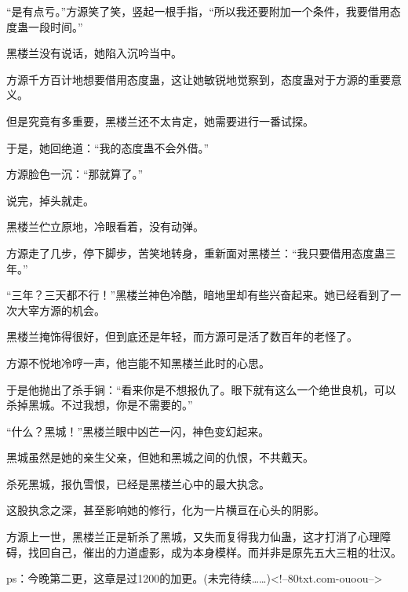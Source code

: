 \begin{this_body}
“是有点亏。”方源笑了笑，竖起一根手指，“所以我还要附加一个条件，我要借用态度蛊一段时间。”

黑楼兰没有说话，她陷入沉吟当中。

方源千方百计地想要借用态度蛊，这让她敏锐地觉察到，态度蛊对于方源的重要意义。

但是究竟有多重要，黑楼兰还不太肯定，她需要进行一番试探。

于是，她回绝道：“我的态度蛊不会外借。”

方源脸色一沉：“那就算了。”

说完，掉头就走。

黑楼兰伫立原地，冷眼看着，没有动弹。

方源走了几步，停下脚步，苦笑地转身，重新面对黑楼兰：“我只要借用态度蛊三年。”

“三年？三天都不行！”黑楼兰神色冷酷，暗地里却有些兴奋起来。她已经看到了一次大宰方源的机会。

黑楼兰掩饰得很好，但到底还是年轻，而方源可是活了数百年的老怪了。

方源不悦地冷哼一声，他岂能不知黑楼兰此时的心思。

于是他抛出了杀手锏：“看来你是不想报仇了。眼下就有这么一个绝世良机，可以杀掉黑城。不过我想，你是不需要的。”

“什么？黑城！”黑楼兰眼中凶芒一闪，神色变幻起来。

黑城虽然是她的亲生父亲，但她和黑城之间的仇恨，不共戴天。

杀死黑城，报仇雪恨，已经是黑楼兰心中的最大执念。

这股执念之深，甚至影响她的修行，化为一片横亘在心头的阴影。

方源上一世，黑楼兰正是斩杀了黑城，又失而复得我力仙蛊，这才打消了心理障碍，找回自己，催出的力道虚影，成为本身模样。而并非是原先五大三粗的壮汉。

ps：今晚第二更，这章是过1200的加更。(未完待续……)<!--80txt.com-ouoou-->

\end{this_body}

